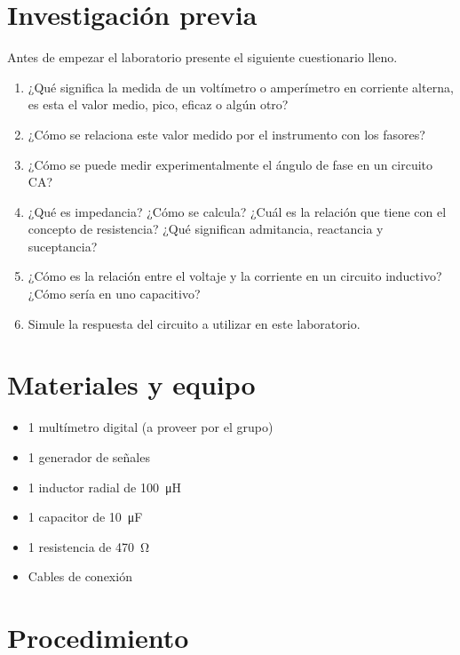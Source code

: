 \documentclass[12pt,letterpaper]{report}
\newcommand{\inv}{Investigación previa}
\newcommand{\mat}{Materiales y equipo}
\newcommand{\pro}{Procedimiento}
\newcommand{\antesde}{Antes de empezar el laboratorio presente el siguiente cuestionario lleno.}
\begin{document}
\section{\inv}
\antesde
\begin{enumerate}
\item ¿Qué significa la medida de un voltímetro o amperímetro en corriente alterna,
es esta el valor medio, pico, eficaz o algún otro?
\item ¿Cómo se relaciona este valor medido por el instrumento con los fasores?
\item ¿Cómo se puede medir experimentalmente el ángulo de fase en un circuito
CA?
\item ¿Qué es impedancia? ¿Cómo se calcula? ¿Cuál es la relación que tiene con
el concepto de resistencia? ¿Qué significan admitancia, reactancia y
suceptancia?
\item ¿Cómo es la relación entre el voltaje y la corriente en un circuito inductivo?
¿Cómo sería en uno capacitivo?
\item Simule la respuesta del circuito a utilizar en este laboratorio.
\end{enumerate}

\section{\mat}

\begin{itemize}
\item 1 multímetro digital (a proveer por el grupo)
\item 1 generador de señales
\item 1 inductor radial de \SI{100}{\micro\henry}
\item 1 capacitor de \SI{10}{\micro\farad}
\item 1 resistencia de \SI{470}{\ohm}
\item Cables de conexión
\end{itemize}

\section{\pro}
\end{document}
